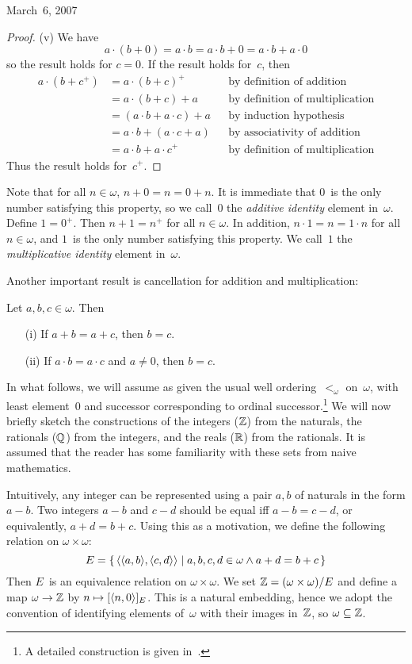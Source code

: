 \begin{lecture}{March~6, 2007}
\begin{proof}
(v) We have
\[a\cdot(b+0)=a\cdot b=a\cdot b+0=a\cdot b+a\cdot 0\]
so the result holds for \(c=0\). If the result holds for~\(c\), then
\begin{align*}
a\cdot(b+c^+)&=a\cdot(b+c)^+&&\text{by definition of addition}\\
	&=a\cdot(b+c)+a&&\text{by definition of multiplication}\\
	&=(a\cdot b+a\cdot c)+a&&\text{by induction hypothesis}\\
	&=a\cdot b+(a\cdot c+a)&&\text{by associativity of addition}\\
	&=a\cdot b+a\cdot c^+&&\text{by definition of multiplication}
\end{align*}
Thus the result holds for~\(c^+\).
\end{proof}

Note that for all \(n\in\omega\), \(n+0=n=0+n\). It is immediate that \(0\)~is the only number satisfying this property, so we call~\(0\) the \emph{additive identity} element in~\(\omega\). Define \(1=0^+\). Then \(n+1=n^+\) for all \(n\in\omega\). In addition, \(n\cdot 1=n=1\cdot n\) for all \(n\in\omega\), and \(1\)~is the only number satisfying this property. We call~\(1\) the \emph{multiplicative identity} element in~\(\omega\).

Another important result is cancellation for addition and multiplication:
\begin{thm}
Let \(a,b,c\in\omega\). Then
\begin{enumerate}[itemsep=0pt]
\item[(i)] If \(a+b=a+c\), then \(b=c\).
\item[(ii)] If \(a\cdot b=a\cdot c\) and \(a\ne0\), then \(b=c\).
\end{enumerate}
\end{thm}

In what follows, we will assume as given the usual well ordering~\(<_{\omega}\) on~\(\omega\), with least element~\(0\) and successor corresponding to ordinal successor.\footnote{A detailed construction is given in~\cite{enderton77}.} We will now briefly sketch the constructions of the integers (\(\mathbb{Z}\)) from the naturals, the rationals (\(\mathbb{Q}\)) from the integers, and the reals (\(\mathbb{R}\)) from the rationals. It is assumed that the reader has some familiarity with these sets from naive mathematics.

Intuitively, any integer can be represented using a pair \(a,b\) of naturals in the form \(a-b\). Two integers \(a-b\) and \(c-d\) should be equal iff \(a-b=c-d\), or equivalently, \(a+d=b+c\). Using this as a motivation, we define the following relation on \(\omega\times\omega\):
\[E=\{\,\langle{\langle{a},{b}\rangle},{\langle{c},{d}\rangle}\rangle\mid a,b,c,d\in\omega\land a+d=b+c\,\}\]
Then \(E\)~is an equivalence relation on \(\omega\times\omega\). We set \(\mathbb{Z}=(\omega\times\omega)/E\) and define a map \(\omega\to\mathbb{Z}\) by \(n\mapsto[\langle{n},{0}\rangle]_E\). This is a natural embedding, hence we adopt the convention of identifying elements of~\(\omega\) with their images in~\(\mathbb{Z}\), so \(\omega\subseteq\mathbb{Z}\).


\end{lecture}
